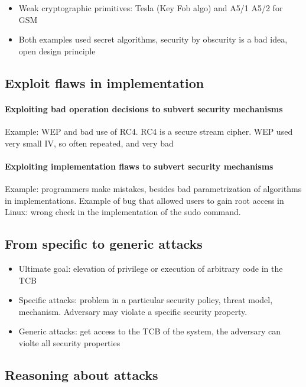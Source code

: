 \documentclass{article}
\newenvironment{myitemize}
{ \begin{itemize}
    \setlength{\itemsep}{005pt}
    \setlength{\parskip}{0pt}
    \setlength{\parsep}{0pt}     }
{ \end{itemize}                  }
\begin{document}
\begin{multicols}{2}
\begin{myitemize}
    \item Weak cryptographic primitives: Tesla (Key Fob algo) and A5/1 A5/2 for GSM
    \item Both examples used secret algorithms, security by obscurity is a bad idea, open design principle
\end{myitemize}


\subsection{Exploit flaws in implementation}

\paragraph{Exploiting bad operation decisions to subvert security mechanisms}
Example: WEP and bad use of RC4.  RC4 is a secure stream cipher. WEP used very small IV, so often repeated, and very bad

\paragraph{Exploiting implementation flaws to subvert security mechanisms}

Example: programmers make mistakes, besides bad parametrization of algorithms in implementations. Example of bug that allowed users to gain root access in Linux: wrong check in the implementation of the sudo command. 


\subsection{From specific to generic attacks}

\begin{myitemize}
    \item Ultimate goal: elevation of privilege or execution of arbitrary code in the TCB
    \item Specific attacks: problem in a particular security policy, threat model, mechanism. Adversary may violate a specific security property. 
    \item Generic attacks: get access to the TCB of the system, the adversary can violte all security properties
\end{myitemize}

\subsection{Reasoning about attacks}


\end{multicols}
\end{document}
